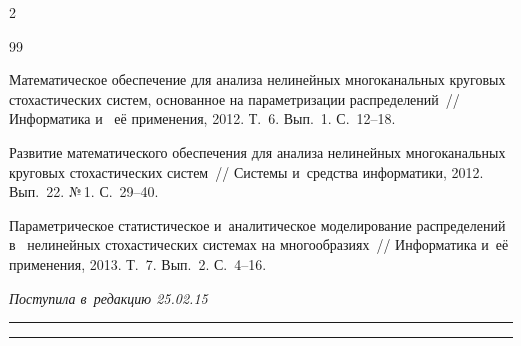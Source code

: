 \begin{multicols}{2}
{{\begin{thebibliography}{99}


Математическое обеспечение для анализа нелинейных многоканальных круговых стохастических систем, основанное на параметризации распределений~// Информатика и~ её применения, 2012. Т.~6. Вып.~1. С.~12--18.







Развитие математического обеспечения для анализа нелинейных многоканальных круговых стохастических систем~// Системы и~средства информатики, 2012. Вып.~22. №\,1. С.~29--40.





Параметрическое статистическое и~аналитическое моделирование распределений в~ нелинейных стохастических системах на многообразиях~// Информатика и~её применения, 2013. Т.~7. Вып.~2. С.~4--16.



 \end{thebibliography}



 }

 }



\end{multicols}



\vspace*{-3pt}



\hfill{\small\textit{Поступила в~редакцию 25.02.15}}






\vspace*{12pt}



\hrule



\vspace*{2pt}



\hrule






